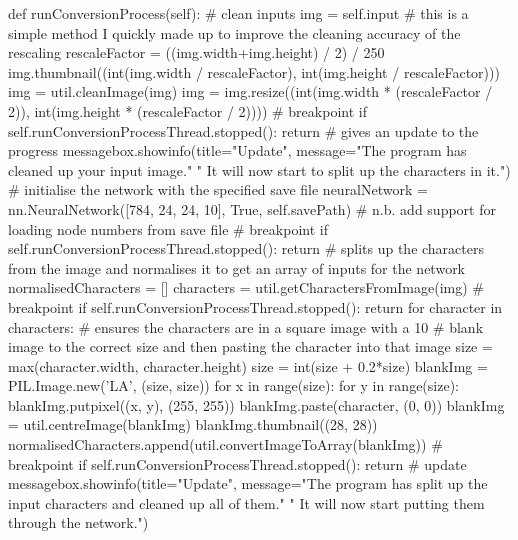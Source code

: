 \documentclass{report}
\begin{document}
\begin{python}
def runConversionProcess(self):
    # clean inputs
    img = self.input
    # this is a simple method I quickly made up to improve the cleaning accuracy of the rescaling
    rescaleFactor = ((img.width+img.height) / 2) / 250
    img.thumbnail((int(img.width / rescaleFactor), int(img.height / rescaleFactor)))
    img = util.cleanImage(img)
    img = img.resize((int(img.width * (rescaleFactor / 2)), int(img.height * (rescaleFactor / 2))))
    # breakpoint
    if self.runConversionProcessThread.stopped():
        return
    # gives an update to the progress
    messagebox.showinfo(title="Update",
        message="The program has cleaned up your input image."
        " It will now start to split up the characters in it.")
    # initialise the network with the specified save file
    neuralNetwork = nn.NeuralNetwork([784, 24, 24, 10], True, self.savePath)  # n.b. add support for loading node numbers from save file
    # breakpoint
    if self.runConversionProcessThread.stopped():
        return
    # splits up the characters from the image and normalises it to get an array of inputs for the network
    normalisedCharacters = []
    characters = util.getCharactersFromImage(img)
    # breakpoint
    if self.runConversionProcessThread.stopped():
        return
    for character in characters:
        # ensures the characters are in a square image with a 10%
        # blank image to the correct size and then pasting the character into that image
        size = max(character.width, character.height)
        size = int(size + 0.2*size)
        blankImg = PIL.Image.new('LA', (size, size))
        for x in range(size):
            for y in range(size):
                blankImg.putpixel((x, y), (255, 255))
        blankImg.paste(character, (0, 0))
        blankImg = util.centreImage(blankImg)
        blankImg.thumbnail((28, 28))
        normalisedCharacters.append(util.convertImageToArray(blankImg))
        # breakpoint
        if self.runConversionProcessThread.stopped():
            return
    # update
    messagebox.showinfo(title="Update",
        message="The program has split up the input characters and cleaned up all of them."
        " It will now start putting them through the network.")


\end{python}
\end{document}
